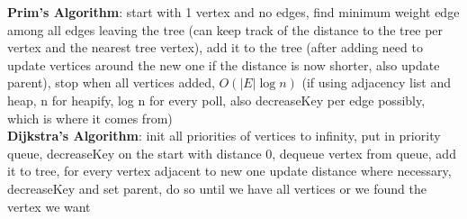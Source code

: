 \documentclass[a4paper]{article}
\begin{document}
\begin{multicols}{2}
        \textbf{Prim's Algorithm}: start with 1 vertex and no edges, find minimum weight edge among all edges leaving the tree (can keep track of the distance to the tree per vertex and the nearest tree vertex), add it to the tree (after adding need to update vertices around the new one if the distance is now shorter, also update parent), stop when all vertices added, $O(|E| \log n)$ (if using adjacency list and heap, n for heapify, log n for every poll, also decreaseKey per edge possibly, which is where it comes from)\\
        \textbf{Dijkstra's Algorithm}: init all priorities of vertices to infinity, put in priority queue, decreaseKey on the start with distance 0, dequeue vertex from queue, add it to tree, for every vertex adjacent to new one update distance where necessary, decreaseKey and set parent, do so until we have all vertices or we found the vertex we want\\
    \end{multicols}
    
\end{document}
